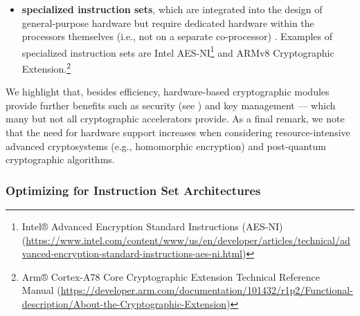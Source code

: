 \begin{itemize}
	\item \textbf{specialized instruction sets}, which are integrated into the design of general-purpose hardware but require dedicated hardware within the processors themselves (i.e., not on a separate co-processor) \cite{cheng_sok_2024}. Examples of specialized instruction sets are Intel AES-NI\footnote{Intel® Advanced Encryption Standard Instructions (AES-NI) (\url{https://www.intel.com/content/www/us/en/developer/articles/technical/advanced-encryption-standard-instructions-aes-ni.html})} and ARMv8 Cryptographic Extension.\footnote{Arm® Cortex-A78 Core Cryptographic Extension Technical Reference Manual (\url{https://developer.arm.com/documentation/101432/r1p2/Functional-description/About-the-Cryptographic-Extension})}
	
\end{itemize}

We highlight that, besides efficiency, hardware-based cryptographic modules provide further benefits such as security (see ) and key management --- which many but not all cryptographic accelerators provide. As a final remark, we note that the need for hardware support increases when considering resource-intensive advanced cryptosystems (e.g., homomorphic encryption) and post-quantum cryptographic algorithms.



\subsubsection{Optimizing for Instruction Set Architectures}\label{sec:security_of_cryptographic_algorithms:performance:processors}

